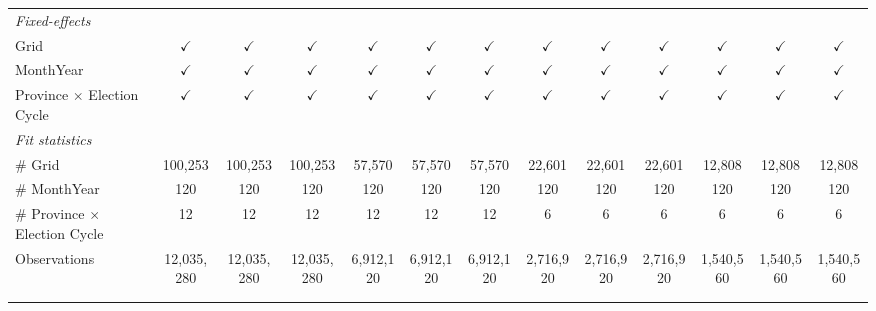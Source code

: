 \begin{table}[htbp]
\begin{tabular}{lcccccccccccc}
      \midrule
      \emph{Fixed-effects}\\
      Grid                                  & $\checkmark$  & $\checkmark$  & $\checkmark$  & $\checkmark$  & $\checkmark$  & $\checkmark$  & $\checkmark$  & $\checkmark$  & $\checkmark$  & $\checkmark$  & $\checkmark$  & $\checkmark$\\   
      MonthYear                             & $\checkmark$  & $\checkmark$  & $\checkmark$  & $\checkmark$  & $\checkmark$  & $\checkmark$  & $\checkmark$  & $\checkmark$  & $\checkmark$  & $\checkmark$  & $\checkmark$  & $\checkmark$\\   
      Province $\times$ Election Cycle      & $\checkmark$  & $\checkmark$  & $\checkmark$  & $\checkmark$  & $\checkmark$  & $\checkmark$  & $\checkmark$  & $\checkmark$  & $\checkmark$  & $\checkmark$  & $\checkmark$  & $\checkmark$\\   
      \midrule
      \emph{Fit statistics}\\
      \# Grid                               & 100,253       & 100,253       & 100,253       & 57,570        & 57,570        & 57,570        & 22,601        & 22,601        & 22,601        & 12,808        & 12,808        & 12,808\\  
      \# MonthYear                          & 120           & 120           & 120           & 120           & 120           & 120           & 120           & 120           & 120           & 120           & 120           & 120\\  
      \# Province $\times$ Election Cycle   & 12            & 12            & 12            & 12            & 12            & 12            & 6             & 6             & 6             & 6             & 6             & 6\\  
      Observations                          & 12,035,280    & 12,035,280    & 12,035,280    & 6,912,120     & 6,912,120     & 6,912,120     & 2,716,920     & 2,716,920     & 2,716,920     & 1,540,560     & 1,540,560     & 1,540,560\\  
      \midrule \midrule
                                            &               &               &               &               &               &               &               &               &               &               &               &  \tabularnewline 
      \\
   \end{tabular}
\end{table}


